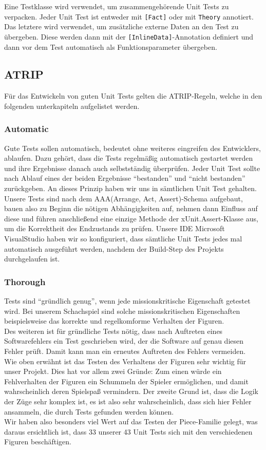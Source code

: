 \documentclass[
10pt, %
a4paper, %
oneside, %
headinclude,footinclude, %
BCOR5mm, %
]{scrartcl}
\begin{document}
\begin{onehalfspace}
Eine Testklasse wird verwendet, um zusammengehörende Unit Tests zu verpacken. Jeder Unit Test ist entweder mit \texttt{[Fact]} oder mit \texttt{Theory} annotiert. Das letztere wird verwendet, um zusätzliche externe Daten an den Test zu übergeben. Diese werden dann mit der \texttt{[InlineData]}-Annotation definiert und dann vor dem Test automatisch als Funktionsparameter übergeben.
\subsection{ATRIP}
Für das Entwickeln von guten Unit Tests gelten die ATRIP-Regeln, welche in den folgenden unterkapiteln aufgelistet werden.
\subsubsection{Automatic}
Gute Tests sollen automatisch, bedeutet ohne weiteres eingreifen des Entwicklers, ablaufen. Dazu gehört, dass die Tests regelmäßig automatisch gestartet werden und ihre Ergebnisse danach auch selbstständig überprüfen. Jeder Unit Test sollte nach Ablauf eines der beiden Ergebnisse \enquote{bestanden} und \enquote{nicht bestanden} zurückgeben.
An dieses Prinzip haben wir uns in sämtlichen Unit Test gehalten. Unsere Tests sind nach dem AAA(Arrange, Act, Assert)-Schema aufgebaut, bauen also zu Beginn die nötigen Abhängigkeiten auf, nehmen dann Einfluss auf diese und führen anschließend eine einzige Methode der xUnit.Assert-Klasse aus, um die Korrektheit des Endzustands zu prüfen. Unsere IDE Microsoft VisualStudio haben wir so konfiguriert, dass sämtliche Unit Tests jedes mal automatisch ausgeführt werden, nachdem der Build-Step des Projekts durchgelaufen ist.

\subsubsection{Thorough}
Tests sind \enquote{gründlich genug}, wenn jede missionskritische Eigenschaft getestet wird. Bei unserem Schachspiel sind solche missionskritischen Eigenschaften beispielsweise das korrekte und regelkomforme Verhalten der Figuren. 
\\
Des weiteren ist für gründliche Tests nötig, dass nach Auftreten eines Softwarefehlers ein Test geschrieben wird, der die Software auf genau diesen Fehler prüft. Damit kann man ein erneutes Auftreten des Fehlers vermeiden.
\\
Wie oben erwähnt ist das Testen des Verhaltens der Figuren sehr wichtig für unser Projekt. Dies hat vor allem zwei Gründe:
Zum einen würde ein Fehlverhalten der Figuren ein Schummeln der Spieler ermöglichen, und damit wahrscheinlich deren Spielspaß vermindern. 
Der zweite Grund ist, dass die Logik der Züge sehr komplex ist, es ist also sehr wahrscheinlich, dass sich hier Fehler ansammeln, die durch Tests gefunden werden können.
\\
Wir haben also besonders viel Wert auf das Testen der Piece-Familie gelegt, was daraus ersichtlich ist, dass 33 unserer 43 Unit Tests sich mit den verschiedenen Figuren beschäftigen.


\end{onehalfspace}
\end{document}
